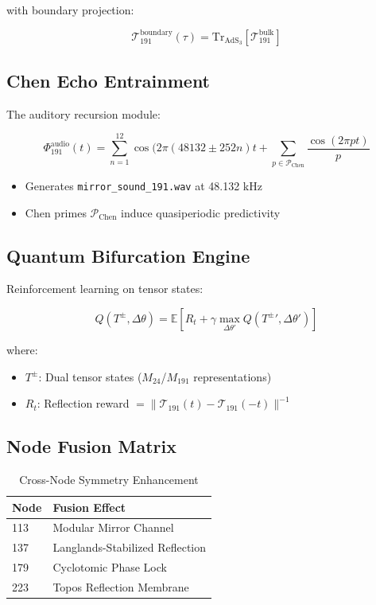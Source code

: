 \documentclass[12pt]{article}
\begin{document}
\begin{center}
with boundary projection:

\[
\mathcal{T}_{191}^{\text{boundary}}(\tau) = \text{Tr}_{\text{AdS}_3}\left[\mathcal{T}_{191}^{\text{bulk}}\right]
\]

\subsection{Chen Echo Entrainment}
\label{subsec:audio}

The auditory recursion module:

\[
\Phi_{191}^{\text{audio}}(t) = \sum_{n=1}^{12} \cos(2\pi(48132 \pm 252n)t + \sum_{p \in \mathcal{P}_{\text{Chen}}} \frac{\cos(2\pi pt)}{p}
\]

\begin{itemize}
    \item Generates \texttt{mirror\_sound\_191.wav} at 48.132 kHz
    \item Chen primes $\mathcal{P}_{\text{Chen}}$ induce quasiperiodic predictivity
\end{itemize}

\subsection{Quantum Bifurcation Engine}
\label{subsec:qrl}

Reinforcement learning on tensor states:

\[
Q(T^{\pm}, \Delta\theta) = \mathbb{E}\left[R_t + \gamma \max_{\Delta\theta'} Q(T^{\pm}', \Delta\theta')\right]
\]

where:
\begin{itemize}
    \item $T^{\pm}$: Dual tensor states ($M_{24}$/$M_{191}$ representations)
    \item $R_t$: Reflection reward $= \| \mathcal{T}_{191}(t) - \mathcal{T}_{191}(-t) \|^{-1}$
\end{itemize}

\subsection{Node Fusion Matrix}
\label{subsec:fusion}

\begin{table}[h]
\centering
\caption{Cross-Node Symmetry Enhancement}
\begin{tabular}{ll}
\hline
\textbf{Node} & \textbf{Fusion Effect} \\
\hline
113 & Modular Mirror Channel \\
137 & Langlands-Stabilized Reflection \\
179 & Cyclotomic Phase Lock \\
223 & Topos Reflection Membrane \\
\hline
\end{tabular}
\end{table}


\end{center}
\end{document}
